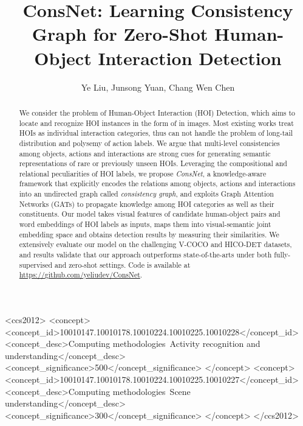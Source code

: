\documentclass[sigconf,screen]{acmart}
\begin{document}
\title{ConsNet: Learning Consistency Graph for Zero-Shot Human-Object Interaction Detection}

\author{Ye Liu, Junsong Yuan, Chang Wen Chen}

\renewcommand{\authors}{Ye Liu, Junsong Yuan, and Chang Wen Chen}
\renewcommand{\shortauthors}{\authors}

\begin{abstract}

We consider the problem of Human-Object Interaction (HOI) Detection, which aims to locate and recognize HOI instances in the form of  in images. Most existing works treat HOIs as individual interaction categories, thus can not handle the problem of long-tail distribution and polysemy of action labels. We argue that multi-level consistencies among objects, actions and interactions are strong cues for generating semantic representations of rare or previously unseen HOIs. Leveraging the compositional and relational peculiarities of HOI labels, we propose \textit{ConsNet}, a knowledge-aware framework that explicitly encodes the relations among objects, actions and interactions into an undirected graph called \textit{consistency graph}, and exploits Graph Attention Networks (GATs) to propagate knowledge among HOI categories as well as their constituents. Our model takes visual features of candidate human-object pairs and word embeddings of HOI labels as inputs, maps them into visual-semantic joint embedding space and obtains detection results by measuring their similarities. We extensively evaluate our model on the challenging V-COCO and HICO-DET datasets, and results validate that our approach outperforms state-of-the-arts under both fully-supervised and zero-shot settings. Code is available at \href{https://github.com/yeliudev/ConsNet}{https://github.com/yeliudev/ConsNet}.

\end{abstract}

\begin{CCSXML}
<ccs2012>
<concept>
<concept_id>10010147.10010178.10010224.10010225.10010228</concept_id>
<concept_desc>Computing methodologies~Activity recognition and understanding</concept_desc>
<concept_significance>500</concept_significance>
</concept>
<concept>
<concept_id>10010147.10010178.10010224.10010225.10010227</concept_id>
<concept_desc>Computing methodologies~Scene understanding</concept_desc>
<concept_significance>300</concept_significance>
</concept>
</ccs2012>
\end{CCSXML}
\end{document}
